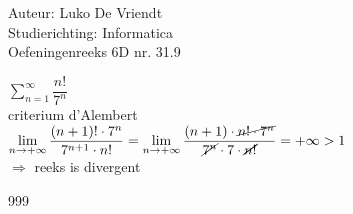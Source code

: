 \documentclass[a4paper]{article}
\begin{document}
\noindent \large Auteur: Luko De Vriendt\\
\noindent \large Studierichting: Informatica\\
\noindent \large Oefeningenreeks 6D nr. 31.9\\

\medskip

\normalsize

$\sum \limits_{n = 1}^{\infty} \dfrac{n!}{7^n}$ \\

criterium d'Alembert \\

$\lim \limits_{n \rightarrow +\infty} \dfrac{(n+1)! \cdot 7^n}{7^{n+1} \cdot n!} = \lim \limits_{n \rightarrow +\infty} \dfrac{(n+1) \cdot \cancel{n!\cdot7^n}}{\cancel{7^n} \cdot 7 \cdot \cancel{n!}} = +\infty > 1$ \\

$\Rightarrow$ reeks is divergent\\

\begin{thebibliography}{999}
\end{thebibliography}
\end{document}
